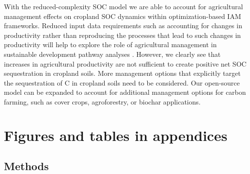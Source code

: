 \documentclass[gc, manuscript]{copernicus}
\begin{document}
With the reduced-complexity SOC model we are able to account for agricultural management effects on cropland SOC dynamics within optimization-based IAM frameworks. Reduced input data requirements such as accounting for changes in productivity rather than reproducing the processes that lead to such changes in productivity \citep{elliott_management_trends_2018} will help to explore the role of agricultural management in sustainable development pathway analyses \citep{sorgel_sustainable_2021}.
However, we clearly see that increases in agricultural productivity are not sufficient to create positive net SOC sequestration in cropland soils. More management options that explicitly target the sequestration of C in cropland soils need to be considered. Our open-source model can be expanded to account for additional management options for carbon farming, such as cover crops, agroforestry, or biochar applications.







\appendix
\section{Figures and tables in appendices}

\subsection{Methods}
\end{document}

